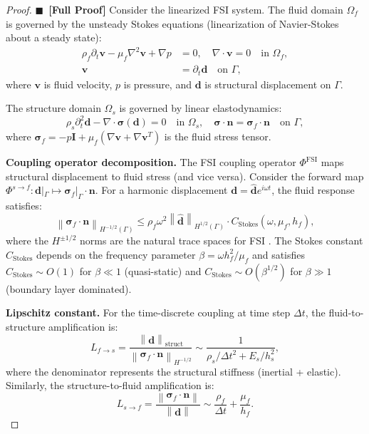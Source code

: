 \documentclass[11pt,a4paper]{article}
\theoremstyle{definition}
\newcommand{\rigorFull}[0]{$\blacksquare$~\textbf{[Full Proof]}}
\newcommand{\norm}[1]{\left\lVert#1\right\rVert}
\newcommand{\interface}{\Gamma}
\begin{document}
\begin{proof}\rigorFull
Consider the linearized FSI system. The fluid domain $\Omega_f$ is governed by the unsteady Stokes equations (linearization of Navier-Stokes about a steady state):
\begin{align}
\rho_f \partial_t \mathbf{v} - \mu_f \nabla^2 \mathbf{v} + \nabla p &= 0, \quad \nabla \cdot \mathbf{v} = 0 \quad \text{in } \Omega_f, \\
\mathbf{v} &= \partial_t \mathbf{d} \quad \text{on } \interface,
\end{align}
where $\mathbf{v}$ is fluid velocity, $p$ is pressure, and $\mathbf{d}$ is structural displacement on $\interface$.

The structure domain $\Omega_s$ is governed by linear elastodynamics:
\begin{equation}
\rho_s \partial_t^2 \mathbf{d} - \nabla \cdot \boldsymbol{\sigma}(\mathbf{d}) = 0 \quad \text{in } \Omega_s, \quad \boldsymbol{\sigma} \cdot \mathbf{n} = \boldsymbol{\sigma}_f \cdot \mathbf{n} \quad \text{on } \interface,
\end{equation}
where $\boldsymbol{\sigma}_f = -p\mathbf{I} + \mu_f(\nabla\mathbf{v} + \nabla\mathbf{v}^T)$ is the fluid stress tensor.

\textbf{Coupling operator decomposition.} The FSI coupling operator $\Phi^{\mathrm{FSI}}$ maps structural displacement to fluid stress (and vice versa). Consider the forward map $\Phi^{s \to f}: \mathbf{d}|_\interface \mapsto \boldsymbol{\sigma}_f|_\interface \cdot \mathbf{n}$. For a harmonic displacement $\mathbf{d} = \hat{\mathbf{d}} e^{i\omega t}$, the fluid response satisfies:
\begin{equation}
\norm{\boldsymbol{\sigma}_f \cdot \mathbf{n}}_{H^{-1/2}(\interface)} \leq \rho_f \omega^2 \norm{\hat{\mathbf{d}}}_{H^{1/2}(\interface)} \cdot C_{\mathrm{Stokes}}(\omega, \mu_f, h_f),
\end{equation}
where the $H^{\pm 1/2}$ norms are the natural trace spaces for FSI \cite{Quarteroni2000}. The Stokes constant $C_{\mathrm{Stokes}}$ depends on the frequency parameter $\beta = \omega h_f^2 / \mu_f$ and satisfies $C_{\mathrm{Stokes}} \sim O(1)$ for $\beta \ll 1$ (quasi-static) and $C_{\mathrm{Stokes}} \sim O(\beta^{1/2})$ for $\beta \gg 1$ (boundary layer dominated).

\textbf{Lipschitz constant.} For the time-discrete coupling at time step $\Delta t$, the fluid-to-structure amplification is:
\begin{equation}
L_{f \to s} = \frac{\norm{\mathbf{d}}_{\mathrm{struct}}}{\norm{\boldsymbol{\sigma}_f \cdot \mathbf{n}}_{H^{-1/2}}} \sim \frac{1}{\rho_s / \Delta t^2 + E_s / h_s^2},
\end{equation}
where the denominator represents the structural stiffness (inertial + elastic). Similarly, the structure-to-fluid amplification is:
\begin{equation}
L_{s \to f} = \frac{\norm{\boldsymbol{\sigma}_f \cdot \mathbf{n}}}{\norm{\mathbf{d}}} \sim \frac{\rho_f}{\Delta t} + \frac{\mu_f}{h_f}.
\end{equation}


\end{proof}
\end{document}
